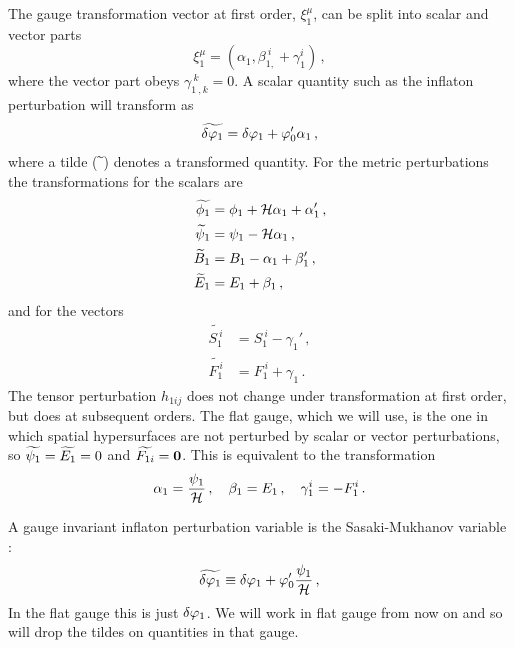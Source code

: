The gauge transformation vector at first order,  $\xi_1^\mu$, can be split into
scalar
and vector parts
% 
\begin{equation}
\label{eq:xidefn-intro}
 \xi_1^\mu = (\alpha_1, \beta_{1,}^{~i} + \gamma_1^i)\,,
\end{equation}
% 
where the vector part obeys $\gamma_{1~,k}^{~k}=0$. A scalar quantity such as
the inflaton perturbation will transform as \cite{Malik:2008im, Malik:2008yp}
% 
\begin{equation}
 \label{eq:dphitransform-intro}
 \widetilde{\delta\varphi_{1}} = \delta\varphi_{1} + \varphi_0' \alpha_1\,,
\end{equation}
where a tilde ($\widetilde{~}$) denotes a transformed quantity. For the metric
perturbations the
transformations for the scalars are
\begin{align}
 \label{transphi1}
\widetilde {\phi_1} &= \phi_1 +\H\alpha_1+\alpha_1'\,,\\
%
\label{transpsi1}
\widetilde \psi_1 &= \psi_1-\H\alpha_1 \,,\\
%
\label{transB1}
\widetilde B_1 &= B_1-\alpha_1+\beta_1'\,,\\
%
\label{transE1}
\widetilde E_1 &= E_1+\beta_1\,,
\end{align}
and for the vectors
\begin{align}
 \label{transS1}
\widetilde {S_{1}^{~i}} &= S_{1}^{~i}-\gamma_1'\,, \\
%
\label{transF1}
\widetilde {F_{1}^{~i}} &= F_{1}^{~i}+\gamma_1\,. 
\end{align}
% 
The tensor perturbation $h_{1ij}$ does not change under transformation at first
order, but does at subsequent orders.
The flat gauge, which we will use, is the one in which spatial hypersurfaces
are not perturbed by scalar or vector perturbations, so $\widetilde{\psi_1} = \widetilde{E_1}
=0$ and $\widetilde{F_{1i}} = \textbf{0}$.  This is equivalent to the transformation
% 
\begin{equation}
 \alpha_1 = \frac{\psi_1}{\mathcal{H}}\,,\quad \beta_1=E_1 \,, \quad \gamma^i_1 =
-F^i_1\,.
\end{equation}

A gauge invariant inflaton perturbation variable is the Sasaki-Mukhanov
variable \cite{Mukhanov:1990me, Mukhanov:1988jd,
Sasaki:1986hm}:
% 
\begin{equation}
\label{eq:flatdvp1-intro}
 \widetilde{\delta\varphi_{1}} \equiv \delta\varphi_{1} + \varphi_0'\frac{\psi_1}{\mathcal{H}}\,,
\end{equation}
% 
In the flat gauge this is just $\delta\varphi_{1}$. We will work in flat
gauge from now on and so will drop the tildes on quantities in that gauge.

